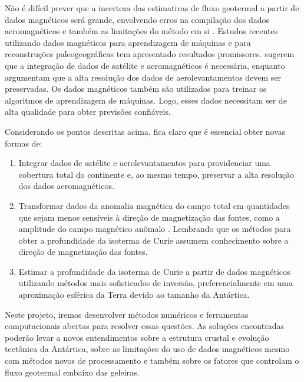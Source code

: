 \documentclass[11pt,a4paper,oneside]{book}
\begin{document}
Não é difícil prever que a incerteza das estimativas de fluxo geotermal a
partir de dados magnéticos será grande, envolvendo erros na compilação dos
dados aeromagnéticos e também as limitações do método em si
\citep{BurtonJohnson2020}.
Estudos recentes utilizando dados magnéticos para aprendizagem de máquinas
\citep{Losing2021} e para reconstruções paleogeográficas \citep{Ebbing2021} tem
apresentado resultados promissores.
\citet{Ebbing2021} sugerem que a integração de dados de satélite e
aeromagnéticos é necessária, enquanto \citet{Lowe2023} argumentam que a alta
resolução dos dados de aerolevantamentos devem ser preservadas.
Os dados magnéticos também são utilizados para treinar os algoritmos de
aprendizagem de máquinas.
Logo, esses dados necessitam ser de alta qualidade para obter previsões
confiáveis.

Considerando os pontos descritas acima, fica claro que é essencial obter novas
formas de:

\begin{enumerate}
  \item Integrar dados de satélite e aerolevantamentos para providenciar uma
    cobertura total do continente e, ao mesmo tempo, preservar a alta resolução
    dos dados aeromagnéticos.
  \item Transformar dados da anomalia magnética do campo total em quantidades
    que sejam menos sensíveis à direção de magnetização das fontes, como a
    amplitude do campo magnético anômalo \citep{Melo2021}. Lembrando que os
    métodos para obter a profundidade da isoterma de Curie assumem conhecimento
    sobre a direção de magnetização das fontes.
  \item Estimar a profundidade da isoterma de Curie a partir de dados
    magnéticos utilizando métodos mais sofisticados de inversão,
    preferencialmente em uma aproximação esférica da Terra devido ao tamanho da
    Antártica.
\end{enumerate}

\noindent
Neste projeto, iremos desenvolver métodos numéricos e ferramentas
computacionais abertas para resolver essas questões.
As soluções encontradas poderão levar a novos entendimentos sobre a estrutura
crustal e evolução tectônica da Antártica, sobre as limitações do uso de dados
magnéticos mesmo com métodos novos de processamento e também sobre os fatores
que controlam o fluxo geotermal embaixo das geleiras.
\end{document}
